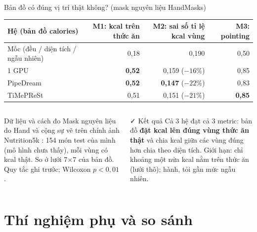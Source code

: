 \documentclass[10pt,aspectratio=169]{beamer}
\newcommand{\highlight}[1]{\textcolor{accent}{\bfseries #1}}
\begin{document}
\begin{frame}{Bản đồ có đúng vị trí thật không? (mask nguyên liệu HandMasks)}
\centering
\scriptsize
\setlength{\tabcolsep}{5pt}
\renewcommand{\arraystretch}{1.2}
\begin{tabular}{@{}lrrr@{}}
\toprule
\textbf{Hệ} (bản đồ calories) & \textbf{M1: kcal trên thức ăn} & \textbf{M2: sai số tỉ lệ kcal vùng} & \textbf{M3: pointing} \\
\midrule
Mốc (đều / diện tích / ngẫu nhiên) & 0,18 & 0,190 & 0,50 \\
1 GPU & \textbf{0,52} & 0,159 ($-16\%$) & 0,85 \\
PipeDream & \textbf{0,52} & \textbf{0,147} ($-22\%$) & 0,83 \\
TiMePReSt & 0,51 & 0,151 ($-21\%$) & \textbf{0,85} \\
\bottomrule
\end{tabular}

\vspace{0.15cm}
\begin{columns}[T]
\begin{uitbox}{\faMap\; Dữ liệu và cách đo}
\scriptsize
Mask nguyên liệu do Hand và cộng sự vẽ trên chính ảnh Nutrition5k \cite{hand2026segmentation}: 154 món test của mình (mô hình chưa thấy), mỗi vùng có kcal thật. So ở lưới 7$\times$7 của bản đồ. Quy tắc ghi trước; Wilcoxon $p < 0{,}01$.
\end{uitbox}
\begin{greenbox}{\faCheck\; Kết quả}
\scriptsize
Cả 3 hệ đạt cả 3 metric: bản đồ \highlight{đặt kcal lên đúng vùng thức ăn thật} và chia kcal giữa các vùng đúng hơn chia theo diện tích. Giới hạn: chỉ khoảng một nửa kcal nằm trên thức ăn (lưới thô); hành, tỏi gần mức ngẫu nhiên.
\end{greenbox}
\end{columns}
\end{frame}

\section{Thí nghiệm phụ và so sánh}
\end{document}
